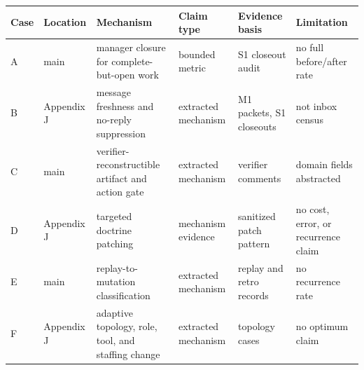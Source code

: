\documentclass[
]{article}
\newcounter{none} %
\begin{document}
{\def\LTcaptype{none} %
\begin{longtable}[]{@{}
  >{\raggedright\arraybackslash}p{}
  >{\raggedright\arraybackslash}p{}
  >{\raggedright\arraybackslash}p{}
  >{\raggedright\arraybackslash}p{}
  >{\raggedright\arraybackslash}p{}
  >{\raggedright\arraybackslash}p{}@{}}
\toprule\noalign{}
\begin{minipage}[b]{\linewidth}\raggedright
Case
\end{minipage} & \begin{minipage}[b]{\linewidth}\raggedright
Location
\end{minipage} & \begin{minipage}[b]{\linewidth}\raggedright
Mechanism
\end{minipage} & \begin{minipage}[b]{\linewidth}\raggedright
Claim type
\end{minipage} & \begin{minipage}[b]{\linewidth}\raggedright
Evidence basis
\end{minipage} & \begin{minipage}[b]{\linewidth}\raggedright
Limitation
\end{minipage} \\
\midrule\noalign{}
\endhead
\bottomrule\noalign{}
\endlastfoot
A & main & manager closure for complete-but-open work & bounded metric & S1 closeout audit & no full before/after rate \\
B & Appendix J & message freshness and no-reply suppression & extracted mechanism & M1 packets, S1 closeouts & not inbox census \\
C & main & verifier-reconstructible artifact and action gate & extracted mechanism & verifier comments & domain fields abstracted \\
D & Appendix J & targeted doctrine patching & mechanism evidence & sanitized patch pattern & no cost, error, or recurrence claim \\
E & main & replay-to-mutation classification & extracted mechanism & replay and retro records & no recurrence rate \\
F & Appendix J & adaptive topology, role, tool, and staffing change & extracted mechanism & topology cases & no optimum claim \\

\end{longtable}}
\end{document}
